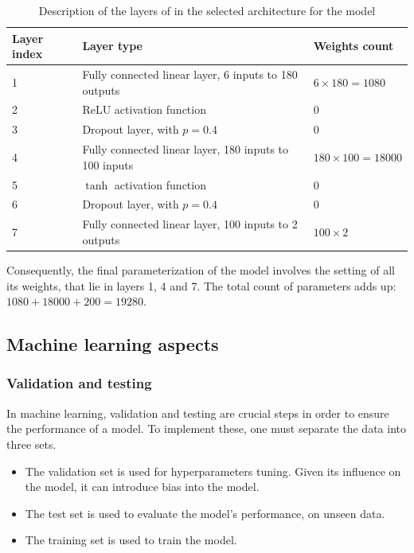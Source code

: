 \begin{table}[h!]
    \centering
    \begin{tabular}{|l|l|l|}
        \hline
        Layer index & Layer type & Weights count \\ \hline
        1 & Fully connected linear layer, 6 inputs to 180 outputs & $6\times 180 = 1080$ \\
        2 & ReLU activation function & 0 \\
        3 & Dropout layer, with $p=0.4$ & 0 \\
        4 & Fully connected linear layer, 180 inputs to 100 inputs & $180\times 100=18000$ \\
        5 & $\tanh$ activation function & 0 \\
        6 & Dropout layer, with $p=0.4$ & 0\\
        7 & Fully connected linear layer, 100 inputs to 2 outputs & $100\times 2$ \\ \hline
    \end{tabular}
    \caption{Description of the layers of in the selected architecture for the model}
    \label{tab:nn-layers}
\end{table}

Consequently, the final parameterization of the model involves the setting of all its weights, that lie in layers 1, 4 and 7. The total count of parameters adds up: $1080 + 18000 + 200 = 19280$.

\subsection{Machine learning aspects}

\subsubsection{Validation and testing\label{ssec:val-testing}}

In machine learning, validation and testing are crucial steps in order to ensure the performance of a model. To implement these, one must separate the data into three sets.

\begin{itemize}
    \item The validation set is used for hyperparameters tuning. Given its influence on the model, it can introduce bias into the model.
    \item The test set is used to evaluate the model's performance, on unseen data.
    \item The training set is used to train the model.
\end{itemize}

